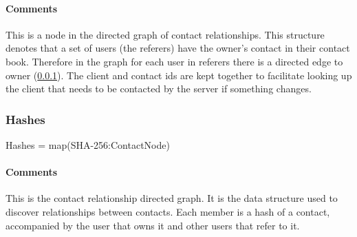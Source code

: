 \documentclass[a4paper,10pt]{article}
\begin{document}
\begin{inparaitem}[ ]
 \item \infrastructure
\end{inparaitem}

\paragraph*{Comments}
This is a node in the directed graph of contact relationships. This structure denotes that a set of users (the referers) have the owner's contact in their contact book. Therefore 
in the graph for each user in referers there is a directed edge to owner (\ref{sec:structure:server:hashes}). The client and contact ids are kept together to facilitate looking up 
the client that needs to be contacted by the server if something changes.

\subsubsection{Hashes}
\label{sec:structure:server:hashes}

\begin{verbbox}
Hashes = map(SHA-256:ContactNode)
\end{verbbox}
\begin{center}
\theverbbox
\end{center}

\begin{inparaitem}[ ]
 \item \unique
 \item \persistent
 \item \secure
\end{inparaitem}

\paragraph*{Comments}
This is the contact relationship directed graph. It is the data structure used to discover relationships between contacts. Each member is a hash of a contact, accompanied by the 
user that owns it and other users that refer to it.



\end{document}
